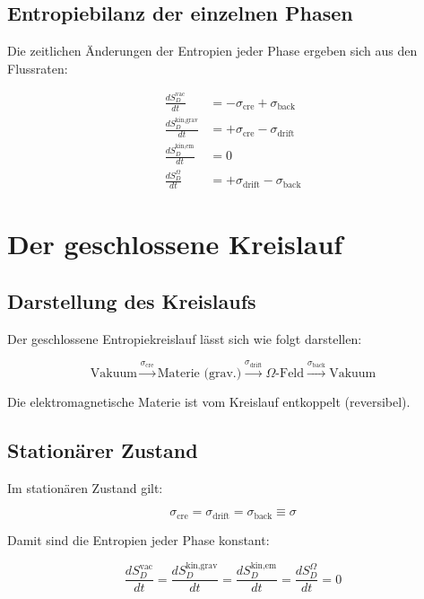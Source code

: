 \subsection{Entropiebilanz der einzelnen Phasen}
\label{sub:fraktale_entropie_bilanz}

Die zeitlichen Änderungen der Entropien jeder Phase ergeben sich aus den Flussraten:

\begin{align}
\frac{dS_D^{\text{vac}}}{dt} &= -\sigma_{\text{cre}} + \sigma_{\text{back}} \tag{L.13a} \\
\frac{dS_D^{\text{kin,grav}}}{dt} &= +\sigma_{\text{cre}} - \sigma_{\text{drift}} \tag{L.13b} \\
\frac{dS_D^{\text{kin,em}}}{dt} &= 0 \tag{L.13c} \\
\frac{dS_D^{\Omega}}{dt} &= +\sigma_{\text{drift}} - \sigma_{\text{back}} \tag{L.13d}
\end{align}

\section{Der geschlossene Kreislauf}
\label{app:fraktale_entropie_kreislauf}

\subsection{Darstellung des Kreislaufs}
\label{sub:fraktale_entropie_kreislauf_darstellung}

Der geschlossene Entropiekreislauf lässt sich wie folgt darstellen:

\[
\text{Vakuum} \xrightarrow{\sigma_{\text{cre}}} \text{Materie (grav.)} \xrightarrow{\sigma_{\text{drift}}} \Omega\text{-Feld} \xrightarrow{\sigma_{\text{back}}} \text{Vakuum}
\]

Die elektromagnetische Materie ist vom Kreislauf entkoppelt (reversibel).

\subsection{Stationärer Zustand}
\label{sub:fraktale_entropie_stationaer}

Im stationären Zustand gilt:

\[
\sigma_{\text{cre}} = \sigma_{\text{drift}} = \sigma_{\text{back}} \equiv \sigma \tag{L.14}
\]

Damit sind die Entropien jeder Phase konstant:

\[
\frac{dS_D^{\text{vac}}}{dt} = \frac{dS_D^{\text{kin,grav}}}{dt} = \frac{dS_D^{\text{kin,em}}}{dt} = \frac{dS_D^{\Omega}}{dt} = 0 \tag{L.15}
\]

